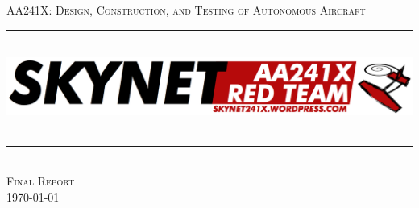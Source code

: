 \documentclass[11pt]{article}
\newcommand{\HRule}{\rule{\linewidth}{0.5mm}}
\begin{document}
\begin{titlepage}
	\begin{center}

\textsc{\LARGE AA241X: Design, Construction, and Testing of Autonomous Aircraft}\\
\HRule \\[0.4cm]
\includegraphics[width=1.0\textwidth]{./skynet}~\\
\HRule \\[0.4cm]
\textsc{\Large Final Report}\\
{\large \today}
\vfill


\end{center}
\end{titlepage}
\end{document}
